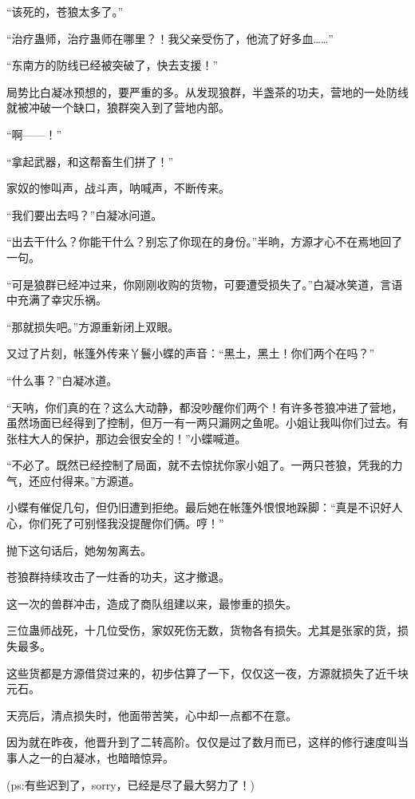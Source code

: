 \begin{this_body}
“该死的，苍狼太多了。”

“治疗蛊师，治疗蛊师在哪里？！我父亲受伤了，他流了好多血……”

“东南方的防线已经被突破了，快去支援！”

局势比白凝冰预想的，要严重的多。从发现狼群，半盏茶的功夫，营地的一处防线就被冲破一个缺口，狼群突入到了营地内部。

“啊——！”

“拿起武器，和这帮畜生们拼了！”

家奴的惨叫声，战斗声，呐喊声，不断传来。

“我们要出去吗？”白凝冰问道。

“出去干什么？你能干什么？别忘了你现在的身份。”半晌，方源才心不在焉地回了一句。

“可是狼群已经冲过来，你刚刚收购的货物，可要遭受损失了。”白凝冰笑道，言语中充满了幸灾乐祸。

“那就损失吧。”方源重新闭上双眼。

又过了片刻，帐篷外传来丫鬟小蝶的声音：“黑土，黑土！你们两个在吗？”

“什么事？”白凝冰道。

“天呐，你们真的在？这么大动静，都没吵醒你们两个！有许多苍狼冲进了营地，虽然场面已经得到了控制，但万一有一两只漏网之鱼呢。小姐让我叫你们过去。有张柱大人的保护，那边会很安全的！”小蝶喊道。

“不必了。既然已经控制了局面，就不去惊扰你家小姐了。一两只苍狼，凭我的力气，还应付得来。”方源道。

小蝶有催促几句，但仍旧遭到拒绝。最后她在帐篷外恨恨地跺脚：“真是不识好人心，你们死了可别怪我没提醒你们俩。哼！”

抛下这句话后，她匆匆离去。

苍狼群持续攻击了一炷香的功夫，这才撤退。

这一次的兽群冲击，造成了商队组建以来，最惨重的损失。

三位蛊师战死，十几位受伤，家奴死伤无数，货物各有损失。尤其是张家的货，损失最多。

这些货都是方源借贷过来的，初步估算了一下，仅仅这一夜，方源就损失了近千块元石。

天亮后，清点损失时，他面带苦笑，心中却一点都不在意。

因为就在昨夜，他晋升到了二转高阶。仅仅是过了数月而已，这样的修行速度叫当事人之一的白凝冰，也暗暗惊异。

(ps:有些迟到了，sorry，已经是尽了最大努力了！)

\end{this_body}

